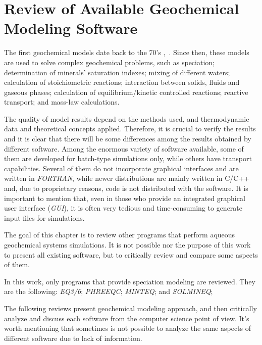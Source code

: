 

\chapter{Review of Available Geochemical Modeling Software}
\label{chapter:review}
The first geochemical models date back to the 70’s \cite{Westall:76},~\cite{Wolery:1979}. 
Since then, these models are used to solve complex geochemical problems, such as speciation; determination of minerals' saturation indexes; mixing of different waters; calculation of stoichiometric reactions; interaction between solids, fluids and gaseous phases; calculation of equilibrium/kinetic controlled reactions; reactive transport; and mass-law calculations.

The quality of model results depend on the methods used, and thermodynamic data and theoretical concepts applied. Therefore, it is crucial to verify the results and it is clear that there will be some differences among the results obtained by different software. Among the enormous variety of software available, some of them are developed for batch-type simulations only, while others have transport capabilities. Several of them do not incorporate graphical interfaces and are written in \emph{FORTRAN}, while newer distributions are mainly written in C/C++ and, due to proprietary reasons, code is not distributed with the software. It is important to mention that, even in those who provide an integrated graphical user interface (\emph{GUI}), it is often very tedious and time-consuming to generate input files for simulations.

The goal of this chapter is to review other programs that perform aqueous geochemical systems simulations. It is not possible nor the purpose of this work to present all existing software, but to critically review and compare some aspects of them. 

In this work, only programs that provide speciation modeling are reviewed. They are the following: \emph{EQ3/6}; \emph{PHREEQC}; \emph{MINTEQ}; and \emph{SOLMINEQ};

The following reviews present geochemical modeling approach, and then critically analyze and discuss each software from the computer science point of view. It's worth mentioning that sometimes is not possible to analyze the same aspects of different software due to lack of information.


